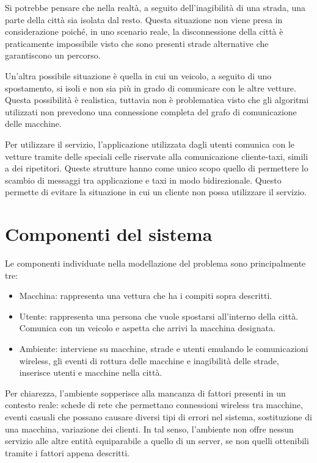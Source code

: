 Si potrebbe pensare che nella realtà, a seguito dell'inagibilità di una strada, una parte della città sia isolata dal resto. Questa situazione non viene presa in considerazione poiché, in uno scenario reale, la disconnessione della città è praticamente impossibile visto che sono presenti strade alternative che garantiscono un percorso.

Un'altra possibile situazione è quella in cui un veicolo, a seguito di uno spostamento, si isoli e non sia più in grado di comunicare con le altre vetture. Questa possibilità è realistica, tuttavia non è problematica visto che gli algoritmi utilizzati non prevedono una connessione completa del grafo di comunicazione delle macchine.

Per utilizzare il servizio, l'applicazione utilizzata dagli utenti comunica con le vetture tramite delle speciali celle riservate alla comunicazione cliente-taxi, simili a dei ripetitori. Queste strutture hanno come unico scopo quello di permettere lo scambio di messaggi tra applicazione e taxi in modo bidirezionale. Questo permette di evitare la situazione in cui un cliente non possa utilizzare il servizio.

\section{Componenti del sistema}

Le componenti individuate nella modellazione del problema sono principalmente tre:

\begin{itemize}
	\item Macchina: rappresenta una vettura che ha i compiti sopra descritti.
	\item Utente: rappresenta una persona che vuole spostarsi all'interno della città. Comunica con un veicolo e aspetta che arrivi la macchina designata.
	\item Ambiente: interviene su macchine, strade e utenti emulando le comunicazioni wireless, gli eventi di rottura delle macchine e inagibilità delle strade, inserisce utenti e macchine nella città.
\end{itemize}

Per chiarezza, l'ambiente sopperisce alla mancanza di fattori presenti in un contesto reale: schede di rete che permettano connessioni wireless tra macchine, eventi casuali che possano causare diversi tipi di errori nel sistema, sostituzione di una macchina, variazione dei clienti. In tal senso, l'ambiente non offre nessun servizio alle altre entità equiparabile a quello di un server, se non quelli ottenibili tramite i fattori appena descritti.

